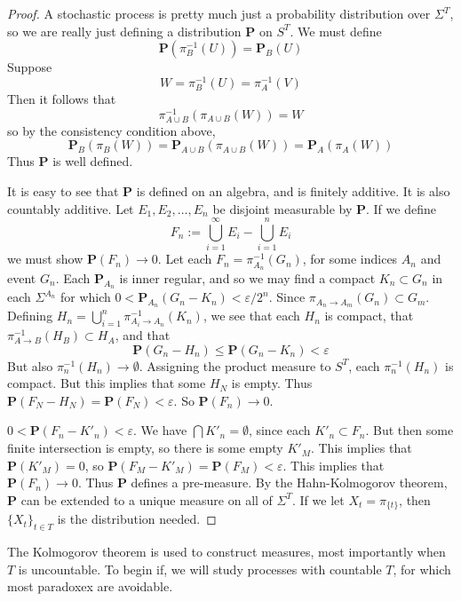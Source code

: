 \documentclass[12pt]{report}
\theoremstyle{plain}
\theoremstyle{definition}
\begin{document}
\begin{proof}
    A stochastic process is pretty much just a probability distribution over $\Sigma^T$, so we are really just defining a distribution $\mathbf{P}$ on $S^T$. We must define
    \[ \mathbf{P}(\pi_B^{-1}(U)) = \mathbf{P}_{B}(U) \]
    Suppose
    \[ W = \pi_B^{-1}(U) = \pi_A^{-1}(V) \]
    Then it follows that
    \[ \pi^{-1}_{A \cup B}(\pi_{A \cup B}(W)) = W \]
    so by the consistency condition above,
    \[ \mathbf{P}_B(\pi_B(W)) = \mathbf{P}_{A \cup B}(\pi_{A \cup B}(W)) = \mathbf{P}_A(\pi_A(W)) \]
    Thus $\mathbf{P}$ is well defined.

    It is easy to see that $\mathbf{P}$ is defined on an algebra, and is finitely additive. It is also countably additive. Let $E_1, E_2, \dots, E_n$ be disjoint measurable by $\mathbf{P}$. If we define
    \[ F_n := \bigcup_{i = 1}^\infty E_i - \bigcup_{i = 1}^n E_i \]
    we must show $\mathbf{P}(F_n) \to 0$. Let each $F_n = \pi^{-1}_{A_n}(G_n)$, for some indices $A_n$ and event $G_n$. Each $\mathbf{P}_{A_n}$ is inner regular, and so we may find a compact $K_n \subset G_n$ in each $\Sigma^{A_n}$ for which $0 < \mathbf{P}_{A_n}(G_n - K_n) < \varepsilon/2^n$. Since $\pi_{A_n \to A_m}(G_n) \subset G_m$. Defining $H_n = \bigcup_{i = 1}^n \pi_{A_i \to A_n}^{-1}(K_n)$, we see that each $H_n$ is compact, that $\pi_{A \to B}^{-1}(H_B) \subset H_A$, and that
    \[ \mathbf{P}(G_n - H_n) \leq \mathbf{P}(G_n - K_n) < \varepsilon \]
    But also $\pi_n^{-1}(H_n) \to \emptyset$. Assigning the product measure to $S^T$, each $\pi_n^{-1}(H_n)$ is compact. But this implies that some $H_N$ is empty. Thus $\mathbf{P}(F_N - H_N) = \mathbf{P}(F_N) < \varepsilon$. So $\mathbf{P}(F_n) \to 0$.

    $0 < \mathbf{P}(F_n - K'_n) < \varepsilon$. We have $\bigcap K'_n = \emptyset$, since each $K'_n \subset F_n$. But then some finite intersection is empty, so there is some empty $K'_M$. This implies that $\mathbf{P}(K'_M) = 0$, so $\mathbf{P}(F_M - K'_M) = \mathbf{P}(F_M) < \varepsilon$. This implies that $\mathbf{P}(F_n) \to 0$. Thus $\mathbf{P}$ defines a pre-measure. By the Hahn-Kolmogorov theorem, $\mathbf{P}$ can be extended to a unique measure on all of $\Sigma^T$. If we let $X_t = \pi_{\{t\}}$, then $\{ X_t \}_{t \in T}$ is the distribution needed.
\end{proof}

The Kolmogorov theorem is used to construct measures, most importantly when $T$ is uncountable. To begin if, we will study processes with countable $T$, for which most paradoxex are avoidable.
\end{document}
